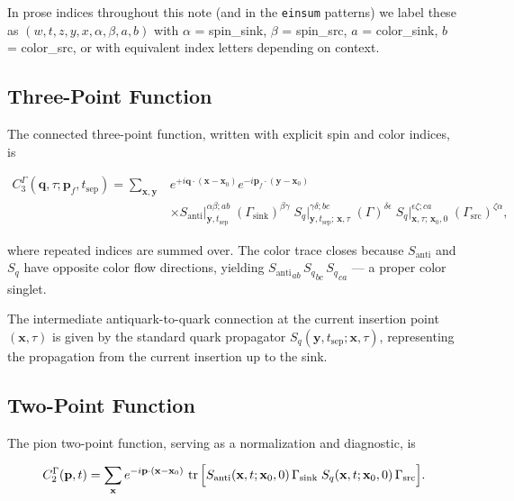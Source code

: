 \documentclass[11pt,a4paper]{article}
\newcommand{\gsrc}{\Gamma_{\text{src}}}
\newcommand{\gsink}{\Gamma_{\text{sink}}}
\newcommand{\gcur}{\Gamma}
\newcommand{\Sq}{S_{q}}
\newcommand{\Santi}{S_{\text{anti}}}
\newcommand{\einsum}{\texttt{einsum}}
\begin{document}
In prose indices throughout this note (and in the \einsum{} patterns) we label
these as \((w, t, z, y, x, \alpha, \beta, a, b)\) with \(\alpha\) = spin\_sink,
\(\beta\) = spin\_src, \(a\) = color\_sink, \(b\) = color\_src, or with
equivalent index letters depending on context.

\subsection{Three-Point Function}

The connected three-point function, written with explicit spin and color
indices, is

\begin{equation}
\begin{aligned}
C_3^\Gamma(\mathbf{q}, \tau; \mathbf{p}_f, t_{\text{sep}})
  = \sum_{\mathbf{x},\mathbf{y}} &
    e^{+i\mathbf{q}\cdot(\mathbf{x}-\mathbf{x}_0)}
    e^{-i\mathbf{p}_f\cdot(\mathbf{y}-\mathbf{x}_0)} \\
  &\times \Santi\big|_{\mathbf{y},t_{\text{sep}}}^{\alpha\beta;ab}
    \; (\gsink)^{\beta\gamma} \;
    \Sq\big|_{\mathbf{y},t_{\text{sep}};\,\mathbf{x},\tau}^{\gamma\delta;bc}
    \; (\gcur)^{\delta\epsilon} \;
    \Sq\big|_{\mathbf{x},\tau;\,\mathbf{x}_0,0}^{\epsilon\zeta;ca}
    \; (\gsrc)^{\zeta\alpha} ,
\end{aligned}
\label{eq:C3_index}
\end{equation}

where repeated indices are summed over.  The color trace closes because
\(\Santi\) and \(\Sq\) have opposite color flow directions, yielding
\({\Santi}_{ab} \, {\Sq}_{bc} \, {\Sq}_{ca}\) --- a proper color singlet.

The intermediate antiquark-to-quark connection at the current insertion point
\((\mathbf{x}, \tau)\) is given by the standard quark propagator \(\Sq(\mathbf{y},
t_{\text{sep}}; \mathbf{x}, \tau)\), representing the propagation from the
current insertion up to the sink.

\subsection{Two-Point Function}

The pion two-point function, serving as a normalization and diagnostic, is

\begin{equation}
C_2^\Gamma(\mathbf{p}, t)
  = \sum_{\mathbf{x}}
    e^{-i\mathbf{p}\cdot(\mathbf{x}-\mathbf{x}_0)} \,
    \tr\Big[
      \Santi(\mathbf{x}, t; \mathbf{x}_0, 0) \,
      \gsink \;
      \Sq(\mathbf{x}, t; \mathbf{x}_0, 0) \,
      \gsrc
    \Big] .
\label{eq:C2_trace}
\end{equation}
\end{document}
